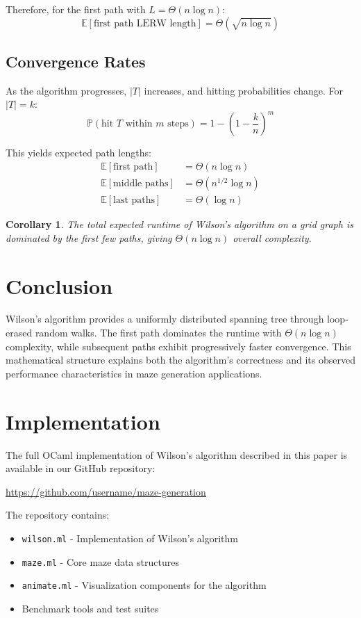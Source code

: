 \documentclass[twocolumn,10pt]{article}
\newtheorem{corollary}[theorem]{Corollary}
\begin{document}
Therefore, for the first path with $L = \Theta(n\log n)$:
\begin{equation}
\mathbb{E}[\text{first path LERW length}] = \Theta(\sqrt{n\log n})
\end{equation}

\subsection{Convergence Rates}

As the algorithm progresses, $|T|$ increases, and hitting probabilities change. For $|T| = k$:
\begin{equation}
\mathbb{P}(\text{hit }T\text{ within }m\text{ steps}) = 1 - \left(1 - \frac{k}{n}\right)^m
\end{equation}

This yields expected path lengths:
\begin{align}
\mathbb{E}[\text{first path}] &= \Theta(n\log n)\\
\mathbb{E}[\text{middle paths}] &= \Theta(n^{1/2}\log n)\\
\mathbb{E}[\text{last paths}] &= \Theta(\log n)
\end{align}

\begin{corollary}
The total expected runtime of Wilson's algorithm on a grid graph is dominated by the first few paths, giving $\Theta(n\log n)$ overall complexity.
\end{corollary}

\section{Conclusion}

Wilson's algorithm provides a uniformly distributed spanning tree through loop-erased random walks. The first path dominates the runtime with $\Theta(n\log n)$ complexity, while subsequent paths exhibit progressively faster convergence. This mathematical structure explains both the algorithm's correctness and its observed performance characteristics in maze generation applications.

\appendix
\section{Implementation}

The full OCaml implementation of Wilson's algorithm described in this paper is available in our GitHub repository:

\begin{center}
\url{https://github.com/username/maze-generation}
\end{center}

The repository contains:
\begin{itemize}
    \item \texttt{wilson.ml} - Implementation of Wilson's algorithm
    \item \texttt{maze.ml} - Core maze data structures
    \item \texttt{animate.ml} - Visualization components for the algorithm
    \item Benchmark tools and test suites
\end{itemize}
\end{document}
